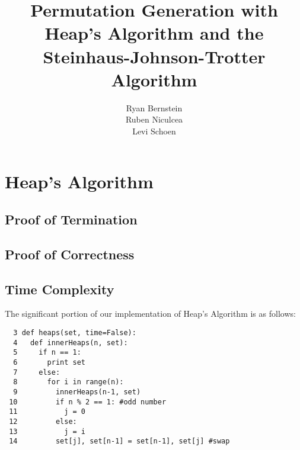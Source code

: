 \documentclass[10pt, oneside]{article}   	%
\title{Permutation Generation with Heap's Algorithm and the Steinhaus-Johnson-Trotter Algorithm}
\author{Ryan Bernstein \\ Ruben Niculcea \\ Levi Schoen}
\date{}							%
\begin{document}
\maketitle

\tableofcontents
\newpage

\section{Heap's Algorithm}

\subsection{Proof of Termination}

\subsection{Proof of Correctness}

\subsection{Time Complexity}

The significant portion of our implementation of Heap's Algorithm is as follows:
\begin{verbatim}
  3 def heaps(set, time=False):
  4   def innerHeaps(n, set):
  5     if n == 1:
  6       print set
  7     else:
  8       for i in range(n):
  9         innerHeaps(n-1, set)
 10         if n % 2 == 1: #odd number
 11           j = 0
 12         else:
 13           j = i
 14         set[j], set[n-1] = set[n-1], set[j] #swap
\end{verbatim}
\end{document}
